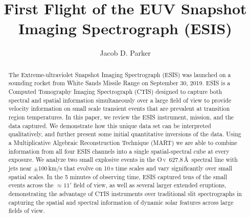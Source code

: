 \renewcommand{\arcsec}{$^{\prime\prime}$} %
\renewcommand{\arcmin}{$^{\prime}$}
\newcommand{\rts}[1]{{\color{violet} RTS: #1}} %
\newcommand{\jdp}[1]{{\color{red} JDP: #1}} %
\newcommand{\cck}[1]{{\color{brown} #1}} %
\newcommand{\amy}[1]{{\color{cyan} ARW: #1}}

\newcommand{\spectralline}[3]{#1\,{\textsc{#2}}\ #3\,\AA\ } %
\newcommand{\ov}{\spectralline{O}{v}{627.8}}
\newcommand{\mgxbright}{\spectralline{Mg}{x}{609.8}}
\newcommand{\mgxdim}{\spectralline{Mg}{x}{626}}
\newcommand{\hei}{\spectralline{He}{i}{584.3}}
\newcommand{\heii}{\spectralline{He}{ii}{304}}


\title{First Flight of the EUV Snapshot Imaging Spectrograph (ESIS)}

\author{Jacob D. Parker}

\begin{abstract}
    The Extreme-ultraviolet Snapshot Imaging Spectrograph (ESIS) was launched on a sounding rocket from White Sands Missile Range on September 30, 2019.
    ESIS is a Computed Tomography Imaging Spectrograph (CTIS) designed to capture both spectral and spatial information simultaneously over a large field of view to provide velocity information on small scale transient events that are prevalent at transition region temperatures.
    In this paper, we review the ESIS instrument, mission, and the data captured.
    We demonstrate how this unique data set can be interpreted qualitatively, and further present some initial quantitative inversions of the data.
    Using a Multiplicative Algebraic Reconstruction \cck{Technique (MART)} we are able to combine information from all four ESIS channels into a single spatial-spectral cube at every exposure.
    We analyze two small explosive events in the \ov spectral line with jets  near $\pm 100$\,km/s that evolve on 10\,s time scales and vary significantly over small spatial scales.
    In the 5 minutes of observing time, ESIS captured tens of the small events across the $\approx 11'$ field of view, as well as several larger extended eruptions, demonstrating the advantage of CTIS instruments over traditional slit spectrographs in capturing the spatial and spectral information of dynamic solar features across large fields of view.
  	
\end{abstract} 

